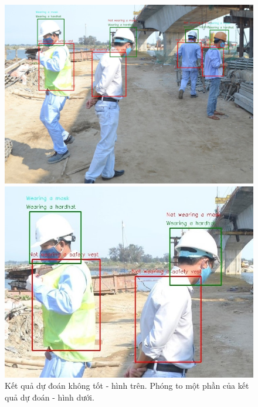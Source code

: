 \begin{figure}[ht!]
	\centerline{\includegraphics[scale=0.3]{images/result_3.jpg}}
	\centerline{\includegraphics[scale=0.6]{images/result_3a.jpg}}
  	\caption{Kết quả dự đoán không tốt - hình trên. Phóng to một phần của kết quả dự đoán - hình dưới.}
  	\label{fig:precision_recall_map}
\end{figure}
